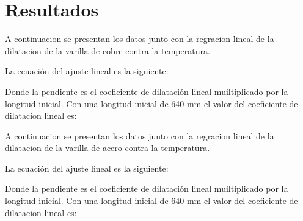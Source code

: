 \section*{Resultados}
A continuacion se presentan los datos junto con la regracion lineal de la dilatacion de la varilla de cobre contra la temperatura.


La ecuaci\'on del ajuste lineal es la siguiente:

Donde la pendiente es el coeficiente de dilataci\'on lineal muiltiplicado por la longitud inicial. Con una longitud inicial de 640 mm el valor del coeficiente de dilatacion lineal es:


A continuacion se presentan los datos junto con la regracion lineal de la dilatacion de la varilla de acero contra la temperatura.

La ecuaci\'on del ajuste lineal es la siguiente:

Donde la pendiente es el coeficiente de dilataci\'on lineal muiltiplicado por la longitud inicial. Con una longitud inicial de 640 mm el valor del coeficiente de dilatacion lineal es:

